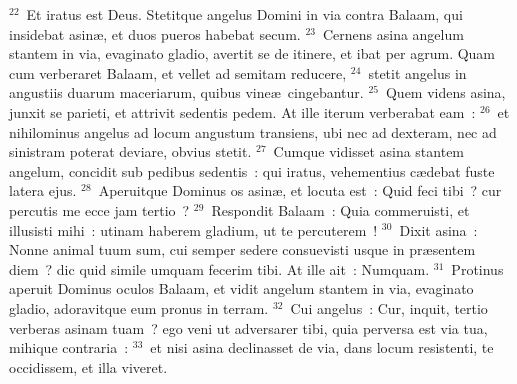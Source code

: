 ${}^{22}$~Et iratus est Deus. Stetitque angelus Domini in via contra Balaam, qui insidebat asin\ae , et duos pueros habebat secum.
${}^{23}$~Cernens asina angelum stantem in via, evaginato gladio, avertit se de itinere, et ibat per agrum. Quam cum verberaret Balaam, et vellet ad semitam reducere,
${}^{24}$~stetit angelus in angustiis duarum maceriarum, quibus vine\ae\ cingebantur.
${}^{25}$~Quem videns asina, junxit se parieti, et attrivit sedentis pedem. At ille iterum verberabat eam~:
${}^{26}$~et nihilominus angelus ad locum angustum transiens, ubi nec ad dexteram, nec ad sinistram poterat deviare, obvius stetit.
${}^{27}$~Cumque vidisset asina stantem angelum, concidit sub pedibus sedentis~: qui iratus, vehementius c\ae debat fuste latera ejus.
${}^{28}$~Aperuitque Dominus os asin\ae , et locuta est~: Quid feci tibi~? cur percutis me ecce jam tertio~?
${}^{29}$~Respondit Balaam~: Quia commeruisti, et illusisti mihi~: utinam haberem gladium, ut te percuterem~!
${}^{30}$~Dixit asina~: Nonne animal tuum sum, cui semper sedere consuevisti usque in pr\ae sentem diem~? dic quid simile umquam fecerim tibi. At ille ait~: Numquam.
${}^{31}$~Protinus aperuit Dominus oculos Balaam, et vidit angelum stantem in via, evaginato gladio, adoravitque eum pronus in terram.
${}^{32}$~Cui angelus~: Cur, inquit, tertio verberas asinam tuam~? ego veni ut adversarer tibi, quia perversa est via tua, mihique contraria~:
${}^{33}$~et nisi asina declinasset de via, dans locum resistenti, te occidissem, et illa viveret.


